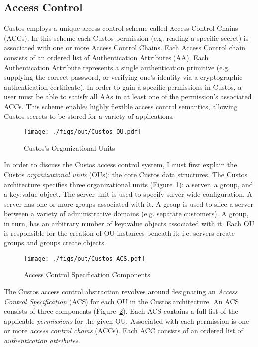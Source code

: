 \subsection{Access Control}
\label{chap:custos:arch:ac}

Custos employs a unique access control scheme called Access Control
Chains (ACCs). In this scheme each Custos permission (e.g. reading a
specific secret) is associated with one or more Access Control
Chains. Each Access Control chain consists of an ordered list of
Authentication Attributes (AA). Each Authentication Attribute
represents a single authentication primitive (e.g. supplying the
correct password, or verifying one's identity via a cryptographic
authentication certificate). In order to gain a specific permissions
in Custos, a user must be able to satisfy all AAs in at least one of
the permission's associated ACCs. This scheme enables highly flexible
access control semantics, allowing Custos secrets to be stored for a
variety of applications.

\begin{figure}[t]
  \centering
  \texttt{[image: ./figs/out/Custos-OU.pdf]}
  \caption{Custos's Organizational Units}
  \label{fig:custos-ou}
\end{figure}

In order to discuss the Custos access control system, I must first
explain the Custos \emph{organizational units} (OUs): the core Custos
data structures. The Custos architecture specifies three
organizational units (Figure~\ref{fig:custos-ou}): a server, a group,
and a key:value object. The server unit is used to specify server-wide
configuration. A server has one or more groups associated with it. A
group is used to slice a server between a variety of administrative
domains (e.g. separate customers). A group, in turn, has an arbitrary
number of key:value objects associated with it. Each OU is responsible
for the creation of OU instances beneath it: i.e. servers create
groups and groups create objects.

\begin{figure}[t]
  \centering
  \texttt{[image: ./figs/out/Custos-ACS.pdf]}
  \caption{Access Control Specification Components}
  \label{fig:custos-acs}
\end{figure}

The Custos access control abstraction revolves around designating an
\emph{Access Control Specification} (ACS) for each OU in the Custos
architecture. An ACS consists of three components
(Figure~\ref{fig:custos-acs}). Each ACS contains a full list of the
applicable \emph{permissions} for the given OU. Associated with each
permission is one or more \emph{access control chains} (ACCs). Each
ACC consists of an ordered list of \emph{authentication attributes}.

